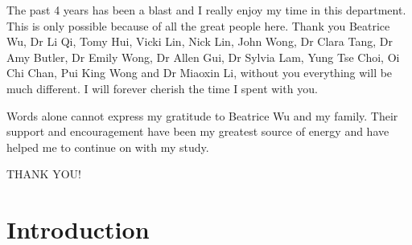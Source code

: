 \documentclass[12pt]{scrbook}
\begin{document}
The past 4 years has been a blast and I really enjoy my time in this department.
This is only possible because of all the great people here.
Thank you Beatrice Wu, Dr Li Qi, Tomy Hui, Vicki Lin, Nick Lin, John Wong, Dr Clara Tang, Dr Amy Butler, Dr Emily Wong, Dr Allen Gui, Dr Sylvia Lam, Yung Tse Choi, Oi Chi Chan, Pui King Wong and Dr Miaoxin Li, without you everything will be much different.
I will forever cherish the time I spent with you. 

Words alone cannot express my gratitude to Beatrice Wu and my family.
Their support and encouragement have been my greatest source of energy and have helped me to continue on with my study. 

\begin{center}
	\large THANK YOU!
\end{center}
\cleardoublepage
{}
\begin{singlespace}
	\printglossary[title=Abbreviations,toctitle=Abbreviations,style=long,nonumberlist]
	\cleardoublepage
	
	\cleardoublepage
	
	\setcounter{tocdepth}{3}
	\tableofcontents
	\listoffigures
	\listoftables
\end{singlespace}
\mainmatter
\pagestyle{fancy}

\setlength{\parindent}{4em}
\setlength{\parskip}{0.75em}
\chapter{Introduction}
\end{document}
